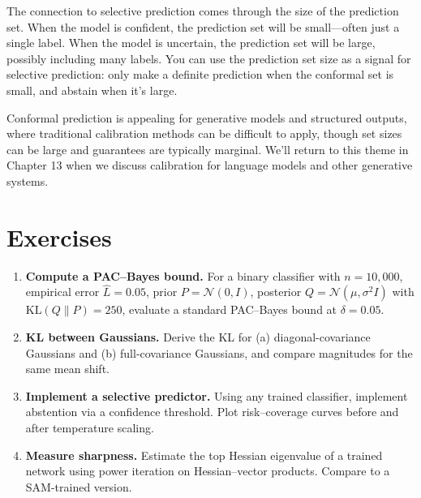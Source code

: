 \vspace{0.3cm}

The connection to selective prediction comes through the size of the prediction set. When the model is confident, the prediction set will be small---often just a single label. When the model is uncertain, the prediction set will be large, possibly including many labels. You can use the prediction set size as a signal for selective prediction: only make a definite prediction when the conformal set is small, and abstain when it's large.

\vspace{0.3cm}

Conformal prediction is appealing for generative models and structured outputs, where traditional calibration methods can be difficult to apply, though set sizes can be large and guarantees are typically marginal. We'll return to this theme in Chapter 13 when we discuss calibration for language models and other generative systems.

\vspace{2em}


\section{Exercises}

\begin{enumerate}
\item \textbf{Compute a PAC--Bayes bound.} For a binary classifier with $n=10{,}000$, empirical error $\hat{L}=0.05$, prior $P=\mathcal{N}(0,I)$, posterior $Q=\mathcal{N}(\mu,\sigma^2 I)$ with $\text{KL}(Q\|P)=250$, evaluate a standard PAC--Bayes bound at $\delta=0.05$.
\item \textbf{KL between Gaussians.} Derive the KL for (a) diagonal-covariance Gaussians and (b) full-covariance Gaussians, and compare magnitudes for the same mean shift.
\item \textbf{Implement a selective predictor.} Using any trained classifier, implement abstention via a confidence threshold. Plot risk--coverage curves before and after temperature scaling.
\item \textbf{Measure sharpness.} Estimate the top Hessian eigenvalue of a trained network using power iteration on Hessian--vector products. Compare to a SAM-trained version.
\end{enumerate}

\vspace{1.5em}

